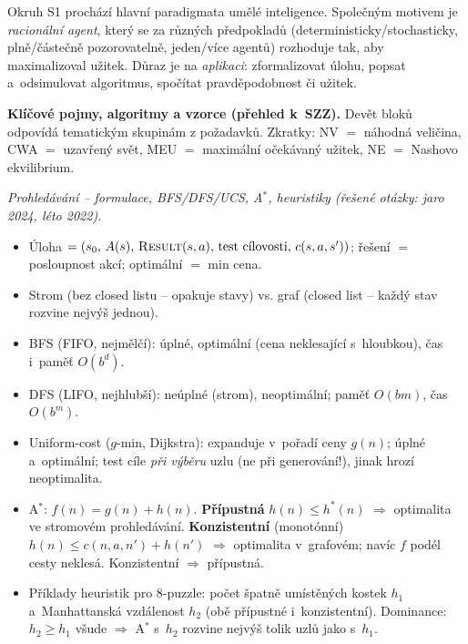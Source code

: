 Okruh S1 prochází hlavní paradigmata umělé inteligence. Společným motivem je \emph{racionální agent}, který se za různých předpokladů (deterministicky/stochasticky, plně/částečně pozorovatelně, jeden/více agentů) rozhoduje tak, aby maximalizoval užitek. Důraz je na \emph{aplikaci}: zformalizovat úlohu, popsat a~odsimulovat algoritmus, spočítat pravděpodobnost či užitek.

\begin{poznamka}
\textbf{Klíčové pojmy, algoritmy a vzorce (přehled k~SZZ).} Devět bloků odpovídá tematickým skupinám z požadavků. Zkratky: NV $=$ náhodná veličina, CWA $=$ uzavřený svět, MEU $=$ maximální očekávaný užitek, NE $=$ Nashovo ekvilibrium.

\smallskip
\emph{Prohledávání -- formulace, BFS/DFS/UCS, A${}^*$, heuristiky (řešené otázky: jaro 2024, léto 2022).}
\begin{itemize}
  \item Úloha $= (s_0,\,A(s),\,\textsc{Result}(s,a),\,\text{test cílovosti},\,c(s,a,s'))$; řešení $=$ posloupnost akcí; optimální $=$ min cena.
  \item Strom (bez closed listu -- opakuje stavy) vs. graf (closed list -- každý stav rozvine nejvýš jednou).
  \item BFS (FIFO, nejmělčí): úplné, optimální (cena neklesající s~hloubkou), čas i~paměť $O(b^d)$.
  \item DFS (LIFO, nejhlubší): neúplné (strom), neoptimální; paměť $O(bm)$, čas $O(b^m)$.
  \item Uniform-cost ($g$-min, Dijkstra): expanduje v~pořadí ceny $g(n)$; úplné a~optimální; test cíle \emph{při výběru} uzlu (ne při generování!), jinak hrozí neoptimalita.
  \item A${}^*$: $f(n)=g(n)+h(n)$. \textbf{Přípustná} $h(n)\le h^*(n)$ $\Rightarrow$ optimalita ve stromovém prohledávání. \textbf{Konzistentní} (monotónní) $h(n)\le c(n,a,n')+h(n')$ $\Rightarrow$ optimalita v~grafovém; navíc $f$ podél cesty neklesá. Konzistentní $\Rightarrow$ přípustná.
  \item Příklady heuristik pro 8-puzzle: počet špatně umístěných kostek $h_1$ a~Manhattanská vzdálenost $h_2$ (obě přípustné i~konzistentní). Dominance: $h_2\ge h_1$ všude $\Rightarrow$ A${}^*$ s~$h_2$ rozvine nejvýš tolik uzlů jako s~$h_1$.
\end{itemize}


\end{poznamka}
